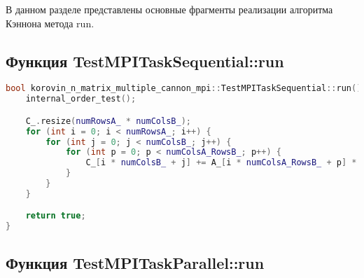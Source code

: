 \documentclass[12pt]{article}
\begin{document}
\hspace*{1.25em}В данном разделе представлены основные фрагменты реализации алгоритма Кэннона метода run.

\clearpage
\subsection*{Функция TestMPITaskSequential::run}

\begin{lstlisting}[language=C++]
bool korovin_n_matrix_multiple_cannon_mpi::TestMPITaskSequential::run() {
    internal_order_test();

    C_.resize(numRowsA_ * numColsB_);
    for (int i = 0; i < numRowsA_; i++) {
        for (int j = 0; j < numColsB_; j++) {
            for (int p = 0; p < numColsA_RowsB_; p++) {
                C_[i * numColsB_ + j] += A_[i * numColsA_RowsB_ + p] * B_[p * numColsB_ + j];
            }
        }
    }

    return true;
}
\end{lstlisting}

\subsection*{Функция TestMPITaskParallel::run}
\end{document}
